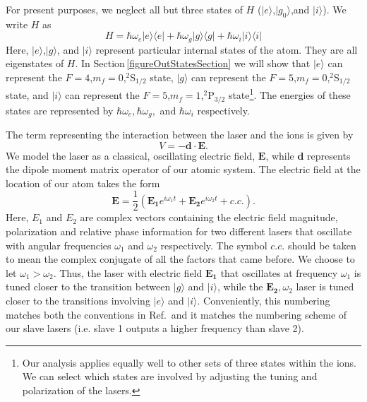 For present purposes, we neglect all but three states of $H$ ($|e\rangle$,$|g_0\rangle$,and $|i\rangle$). We write $H$ as 
\begin{equation}
H=
\hbar\omega_e |e\rangle\langle e | +
\hbar\omega_g |g\rangle\langle g | +
\hbar\omega_i |i\rangle\langle i | 
\end{equation}
Here, $|e\rangle$,$|g\rangle$, and $|i\rangle$ represent particular internal states of the atom. They are all eigenstates of $H$. In Section\,\ref{figureOutStatesSection} we will show that $|e\rangle$ can represent the $F=4$,$m_f=0$,$^2$S$_{1/2}$ state, $|g\rangle$ can represent the $F=5$,$m_f=0$,$^2$S$_{1/2}$ state, and $|i\rangle$ can represent the $F=5$,$m_f=1$,$^2$P$_{3/2}$ state\footnote{Our analysis applies equally well to other sets of three states within the ions. We can select which states are involved by adjusting the tuning and polarization of the lasers.}. The energies of these states are represented by $\hbar\omega_e,\hbar\omega_g,$ and $\hbar\omega_i$ respectively. 

The term representing the interaction between the laser and the ions is given by
\begin{equation}
V=-\mathbf{d}\cdot\mathbf{E}.
\end{equation}
We model the laser as a classical, oscillating electric field, $\mathbf{E}$, while $\mathbf{d}$ represents the dipole moment matrix operator of our atomic system. The electric field at the location of our atom takes the form 
\begin{equation}
\mathbf{E}=\frac{1}{2}\left(\mathbf{E_1} e^{i\omega_1 t} + \mathbf{E_2} e^{i\omega_2 t} + c.c. \right). \label{eqn:Efield}
\end{equation}
Here, $E_1$ and $E_2$ are complex vectors containing the electric field magnitude, polarization and relative phase information for two different lasers that oscillate with angular frequencies $\omega_1$ and $\omega_2$ respectively. The symbol $c.c.$ should be taken to mean the complex conjugate of all the factors that came before. We choose to let $\omega_1>\omega_2$. 
Thus, the laser with electric field $\mathbf{E_1}$ that oscillates at frequency $\omega_1$ is tuned closer to the transition between $|g\rangle$ and $|i\rangle$, while the $\mathbf{E_2}, \omega_2$ laser is tuned closer to the transitions involving $|e\rangle$ and $|i\rangle$. Conveniently, this numbering matches both the conventions in Ref.\,\cite{Young1997363} and it matches the numbering scheme of our slave lasers (i.e. slave 1 outputs a higher frequency than slave 2). 


